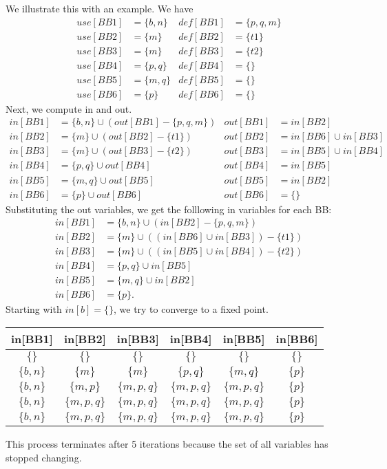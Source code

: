 \documentclass[a4paper, openany]{memoir}
\begin{document}
We illustrate this with an example. We have 
\begin{align*}
    use[BB1] &= \{b, n\} & def[BB1] &= \{p, q, m\} \\
    use[BB2] &= \{m\} & def[BB2] &= \{t1\} \\
    use[BB3] &= \{m\} & def[BB3] &= \{t2\} \\
    use[BB4] &= \{p, q\} & def[BB4] &= \{\} \\
    use[BB5] &= \{m, q\} & def[BB5] &= \{\} \\
    use[BB6] &= \{p\} & def[BB6] &= \{\}
\end{align*}
Next, we compute in and out.
\begin{align*}
    in[BB1] &= \{b, n\} \cup (out[BB1] - \{p, q, m\}) & out[BB1] &= in[BB2] \\
    in[BB2] &= \{m\} \cup (out[BB2] - \{t1\}) & out[BB2] &= in[BB6] \cup in[BB3] \\
    in[BB3] &= \{m\} \cup (out[BB3] - \{t2\}) & out[BB3] &= in[BB5] \cup in[BB4] \\
    in[BB4] &= \{p, q\} \cup out[BB4] & out[BB4] &= in[BB5] \\
    in[BB5] &= \{m, q\} \cup out[BB5] & out[BB5] &= in[BB2] \\
    in[BB6] &= \{p\} \cup out[BB6] & out[BB6] &= \{\}
\end{align*}
Substituting the out variables, we get the folllowing in variables for each BB:
\begin{align*}
    in[BB1] &= \{b, n\} \cup (in[BB2] - \{p, q, m\}) \\
    in[BB2] &= \{m\} \cup ((in[BB6] \cup in[BB3]) - \{t1\}) \\
    in[BB3] &= \{m\} \cup ((in[BB5] \cup in[BB4]) - \{t2\}) \\
    in[BB4] &= \{p, q\} \cup in[BB5] \\
    in[BB5] &= \{m, q\} \cup in[BB2] \\
    in[BB6] &= \{p\}.
\end{align*}
Starting with $in[b] = \{\}$, we try to converge to a fixed point.
\begin{table}[H]
    \centering
    \begin{tabular}{|c|c|c|c|c|c|}
        \hline
        in[BB1] & in[BB2] & in[BB3] & in[BB4] & in[BB5] & in[BB6] \\
        \hline
        $\{\}$ & $\{\}$ & $\{\}$ & $\{\}$ & $\{\}$ & $\{\}$ \\
        $\{b, n\}$ & $\{m\}$ & $\{m\}$ & $\{p, q\}$ & $\{m, q\}$ & $\{p\}$ \\ 
        $\{b, n\}$ & $\{m, p\}$ & $\{m, p, q\}$ & $\{m, p, q\}$ & $\{m, p, q\}$ & $\{p\}$ \\ 
        $\{b, n\}$ & $\{m, p, q\}$ & $\{m, p, q\}$ & $\{m, p, q\}$ & $\{m, p, q\}$ & $\{p\}$ \\  
        $\{b, n\}$ & $\{m, p, q\}$ & $\{m, p, q\}$ & $\{m, p, q\}$ & $\{m, p, q\}$ & $\{p\}$ \\ 
        \hline
    \end{tabular}
\end{table}
\noindent This process terminates after 5 iterations because the set of all variables has stopped changing.
\end{document}
